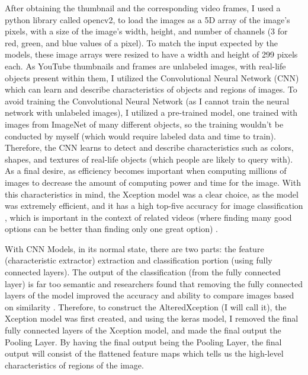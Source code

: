 \documentclass[10pt,twocolumn]{article}
\begin{document}
After obtaining the thumbnail and the corresponding video frames, I used a python library called opencv2, to load the images as a 5D array of the image's pixels, with a size of the image's width, height, and number of channels (3 for red, green, and blue values of a pixel). To match the input expected by the models, these image arrays were resized to have a width and height of 299 pixels each. As YouTube thumbnails and frames are unlabeled images, with real-life objects present within them, I utilized the Convolutional Neural Network (CNN) which can learn and describe characteristics of objects and regions of images. To avoid training the Convolutional Neural Network (as I cannot train the neural network with unlabeled images), I utilized a pre-trained model, one trained with images from ImageNet of many different objects, so the training wouldn't be conducted by myself (which would require labeled data and time to train). Therefore, the CNN learns to detect and describe characteristics such as colors, shapes, and textures of real-life objects (which people are likely to query with). As a final desire, as efficiency becomes important when computing millions of images to decrease the amount of computing power and time for the image. With this characteristics in mind, the Xception model was a clear choice, as the model was extremely efficient, and it has a high top-five accuracy for image classification \cite{Chollet2017}, which is important in the context of related videos (where finding many good options can be better than finding only one great option) \cite{Stancic2022}. 

With CNN Models, in its normal state, there are two parts: the feature (characteristic extractor) extraction and classification portion (using fully connected layers). The output of the classification (from the fully connected layer) is far too semantic and researchers found that removing the fully connected layers of the model improved the accuracy and ability to compare images based on similarity \cite{Qian2020}. Therefore, to construct the AlteredXception (I will call it), the Xception model was first created, and using the keras model, I removed the final fully connected layers of the Xception model, and made the final output the Pooling Layer. By having the final output being the Pooling Layer, the final output will consist of the flattened feature maps which tells us the high-level characteristics of regions of the image.
\end{document}
